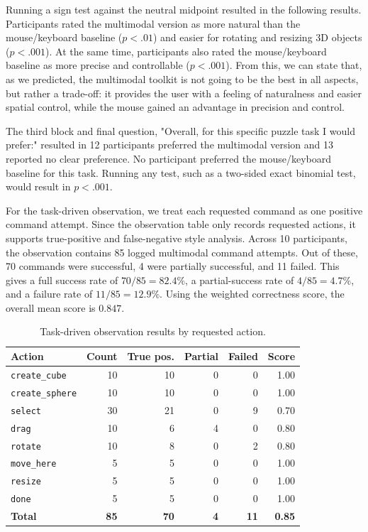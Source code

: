 \documentclass[sigconf]{acmart}
\begin{document}
Running a sign test against the neutral midpoint resulted in the following results.
Participants rated the multimodal version as more natural than the
mouse/keyboard baseline (\(p < .01\)) and easier for rotating and
resizing 3D objects (\(p < .001\)). At the same time, participants
also rated the mouse/keyboard baseline as more precise and controllable
(\(p < .001\)). From this, we can state that, as we predicted, the multimodal toolkit
is not going to be the best in all aspects, but rather a trade-off: it provides the user with
a feeling of naturalness and easier spatial control, while the mouse gained an
advantage in precision and control.

The third block and final question, "Overall, for this specific puzzle task I would prefer:" resulted in
12 participants preferred the multimodal version and 13 reported no
clear preference. No participant preferred the mouse/keyboard baseline for this
task. Running any test, such as a two-sided exact binomial test, would result in
\(p < .001\).

For the task-driven observation, we treat each requested command as one
positive command attempt. Since the observation table only records requested
actions, it supports true-positive and false-negative style analysis. Across
10 participants, the observation contains 85 logged multimodal command
attempts. Out of these, 70 commands were successful, 4 were partially
successful, and 11 failed. This gives a full success rate of
\(70/85 = 82.4\%\), a partial-success rate of \(4/85 = 4.7\%\), and a failure
rate of \(11/85 = 12.9\%\). Using the weighted correctness score, the overall
mean score is \(0.847\).

\begin{table}[htbp]
  \centering
  \caption{Task-driven observation results by requested action.}
  \label{tab:task-observation-results}
  \begin{tabular}{lrrrrr}
    \toprule
    Action & Count & True pos. & Partial & Failed & Score \\
    \midrule
    \texttt{create\_cube} & 10 & 10 & 0 & 0 & 1.00 \\
    \texttt{create\_sphere} & 10 & 10 & 0 & 0 & 1.00 \\
    \texttt{select} & 30 & 21 & 0 & 9 & 0.70 \\
    \texttt{drag} & 10 & 6 & 4 & 0 & 0.80 \\
    \texttt{rotate} & 10 & 8 & 0 & 2 & 0.80 \\
    \texttt{move\_here} & 5 & 5 & 0 & 0 & 1.00 \\
    \texttt{resize} & 5 & 5 & 0 & 0 & 1.00 \\
    \texttt{done} & 5 & 5 & 0 & 0 & 1.00 \\
    \midrule
    \textbf{Total} & \textbf{85} & \textbf{70} & \textbf{4} & \textbf{11} & \textbf{0.85} \\
    \bottomrule
  \end{tabular}
\end{table}
\end{document}
